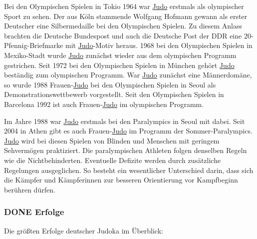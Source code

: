 \documentclass[11pt]{article}
\begin{document}
Bei den Olympischen Spielen in Tokio 1964 war \hyperref[org5f8b831]{Judo} erstmals als olympischer Sport zu sehen. Der aus Köln stammende Wolfgang Hofmann gewann als erster Deutscher eine Silbermedaille bei den Olympischen Spielen. Zu diesem Anlass brachten die Deutsche Bundespost und auch die Deutsche Post der DDR eine 20-Pfennig-Briefmarke mit \hyperref[org5f8b831]{Judo}-Motiv heraus. 1968 bei den Olympischen Spielen in Mexiko-Stadt wurde \hyperref[org5f8b831]{Judo} zunächst wieder aus dem olympischen Programm gestrichen. Seit 1972 bei den Olympischen Spielen in München gehört \hyperref[org5f8b831]{Judo} beständig zum olympischen Programm. War \hyperref[org5f8b831]{Judo} zunächst eine Männerdomäne, so wurde 1988 Frauen-\hyperref[org5f8b831]{Judo} bei den Olympischen Spielen in Seoul als Demonstrationswettbewerb vorgestellt. Seit den Olympischen Spielen in Barcelona 1992 ist auch Frauen-\hyperref[org5f8b831]{Judo} im olympischen Programm.

Im Jahre 1988 war \hyperref[org5f8b831]{Judo} erstmals bei den Paralympics in Seoul mit dabei. Seit 2004 in Athen gibt es auch Frauen-\hyperref[org5f8b831]{Judo} im Programm der Sommer-Paralympics. \hyperref[org5f8b831]{Judo} wird bei diesen Spielen von Blinden und Menschen mit geringem Sehvermögen praktiziert. Die paralympischen Athleten folgen denselben Regeln wie die Nichtbehinderten. Eventuelle Defizite werden durch zusätzliche Regelungen ausgeglichen. So besteht ein wesentlicher Unterschied darin, dass sich die Kämpfer und Kämpferinnen zur besseren Orientierung vor Kampfbeginn berühren dürfen. 

\subsubsection{{\bfseries\sffamily DONE} Erfolge}
\label{sec:orgc2664d3}
Die größten Erfolge deutscher Judoka im Überblick:
\end{document}

